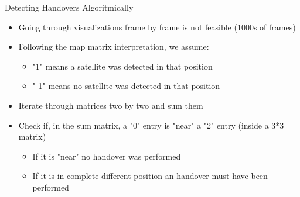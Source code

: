 \documentclass[NET,english,beameralt]{tumbeamer}
\renewcommand\emph[1]{\textcolor{TUMBlue}{#1}}
\begin{document}
\begin{frame}{Detecting Handovers Algoritmically}
    \begin{itemize}
        \item Going through visualizations frame by frame is not feasible (1000s of frames)
        \item Following the map matrix interpretation, we assume:
        \begin{itemize}
            \item "1" means a satellite was detected in that position
            \item  "-1" means no satellite was detected in that position
        \end{itemize} 
        \item Iterate through matrices two by two and sum them
        \item Check if, in the sum matrix, a "0" entry is "near" a "2" entry (inside a 3*3 matrix)
            \begin{itemize}
                \item If it is "near" \emph{no handover was performed}
                \item If it is in complete different position \emph{an handover must have been performed}
            \end{itemize}
    \end{itemize}
\end{frame}
\end{document}
